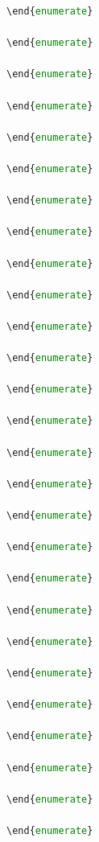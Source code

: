 \begin{itemize}
\begin{itemize}
\begin{itemize}
\begin{itemize}
\begin{itemize}
\begin{itemize}
\begin{enumerate}
\begin{enumerate}
\begin{enumerate}
\begin{enumerate}
\begin{lstlisting}[language=Python]
\end{enumerate}

\end{enumerate}

\end{enumerate}

\end{enumerate}

\end{enumerate}

\end{enumerate}

\end{enumerate}

\end{enumerate}

\end{enumerate}

\end{enumerate}

\end{enumerate}

\end{enumerate}

\end{enumerate}

\end{enumerate}

\end{enumerate}

\end{enumerate}

\end{enumerate}

\end{enumerate}

\end{enumerate}

\end{enumerate}

\end{enumerate}

\end{enumerate}

\end{enumerate}

\end{enumerate}

\end{enumerate}

\end{enumerate}

\end{enumerate}


\end{lstlisting}
\end{enumerate}
\end{enumerate}
\end{enumerate}
\end{enumerate}
\end{itemize}
\end{itemize}
\end{itemize}
\end{itemize}
\end{itemize}
\end{itemize}
